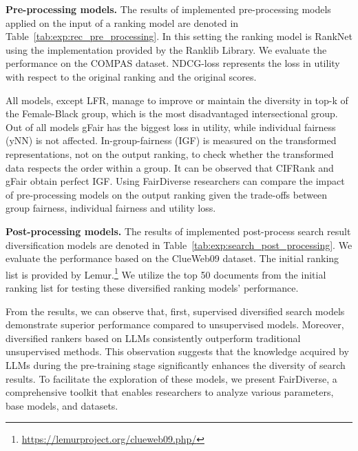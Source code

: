\noindent\textbf{Pre-processing models.} The results of implemented pre-pro\-cessing models applied on the input of a ranking model are denoted in Table~\ref{tab:exp:rec_pre_processing}. In this setting the ranking model is RankNet using the implementation provided by the Ranklib Library. We evaluate the performance on the COMPAS dataset. NDCG-loss represents the loss in utility with respect to the original ranking and the original scores. 

All models, except LFR, manage to improve or maintain the diversity in top-k of the Female-Black group, which is the most disadvantaged intersectional group. Out of all models gFair has the biggest loss in utility, while individual fairness (yNN) is not affected. In-group-fairness (IGF) is measured on the transformed representations, not on the output ranking, to check whether the transformed data respects the order within a group. It can be observed that CIFRank and gFair obtain perfect IGF. Using FairDiverse researchers can compare the impact of pre-processing models on the output ranking given the trade-offs between group fairness, individual fairness and utility loss. 

\noindent\textbf{Post-processing models.} The results of implemented post-process search result diversification models are denoted in Table~\ref{tab:exp:search_post_processing}. We evaluate the performance based on the ClueWeb09 dataset. The initial ranking list is provided by Lemur.\footnote{\url{https://lemurproject.org/clueweb09.php/}} We utilize the top 50 documents from the initial ranking list for testing these diversified ranking models' performance.

From the results, we can observe that, first, supervised diversified search models demonstrate superior performance compared to unsupervised models. Moreover, diversified rankers based on LLMs consistently outperform traditional unsupervised methods. This observation suggests that the knowledge acquired by LLMs during the pre-training stage significantly enhances the diversity of search results. To facilitate the exploration of these models, we present FairDiverse, a comprehensive toolkit that enables researchers to analyze various parameters, base models, and datasets.
